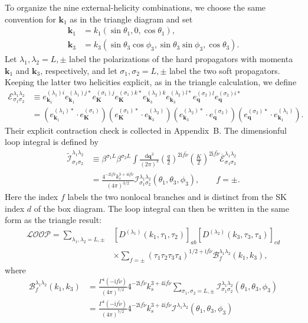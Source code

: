 \documentclass[a4paper,12pt]{article}
\def\di{{\mathrm{d}}}
\def\mb{\mathbf}
\def\ii{\mathrm{i}}
\def\be{\beta}
\def\si{\sigma}
\def\tn{\tilde\nu}
\begin{document}
To organize the nine external-helicity combinations, we choose the same convention for $\mb k_1$ as in
the triangle diagram and set
\begin{align}
    \mb k_1&=k_1(\sin\theta_1,0,\cos\theta_1), \\
    \mb k_3&=k_3(\sin\theta_3\cos\phi_3,\sin\theta_3\sin\phi_3,\cos\theta_3).
\end{align}
Let $\lambda_1,\lambda_2=L,\pm$ label the polarizations of the hard propagators with momenta
$\mb k_1$ and $\mb k_3$, respectively, and let $\sigma_1,\sigma_2=L,\pm$ label the two soft propagators.
Keeping the latter two helicities explicit, as in the triangle calculation, we define
\begin{align}
    \mathcal{E}^{\lambda_1\lambda_2}_{\sigma_1\sigma_2}
    &\equiv
    e_{\mb k_1}^{(\lambda_1)i}e_{\mb k_1}^{(\lambda_1)j*}
    e_{\mb K}^{(\sigma_1)j}e_{\mb K}^{(\sigma_1)k*}
    e_{\mb k_3}^{(\lambda_2)k}e_{\mb k_3}^{(\lambda_2)l*}
    e_{\mb q}^{(\sigma_2)l}e_{\mb q}^{(\sigma_2)i*} \nonumber \\
    &=(e_{\mb k_1}^{(\lambda_1)*}\cdot e_{\mb K}^{(\sigma_1)})
    (e_{\mb K}^{(\sigma_1)*}\cdot e_{\mb k_3}^{(\lambda_2)})
    (e_{\mb k_3}^{(\lambda_2)*}\cdot e_{\mb q}^{(\sigma_2)})
    (e_{\mb q}^{(\sigma_2)*}\cdot e_{\mb k_1}^{(\lambda_1)}).
\end{align}
Their explicit contraction check is collected in Appendix~B. The dimensionful loop integral is defined by
\begin{align}
    \widetilde{\mathcal{I}}^{\lambda_1\lambda_2}_{\sigma_1\sigma_2}
    &\equiv \be^{\si_1L} \be^{\si_2L} \int\frac{\di\mb q^3}{(2\pi)^3}
    \left(\frac{q}{2}\right)^{2\ii f\tn}
    \left(\frac{K}{2}\right)^{2\ii f\tn}
    \overline{\mathcal{E}}^{\lambda_1\lambda_2}_{\sigma_1\sigma_2} \nonumber \\
    &=\frac{4^{-2\ii f\tn}k_s^{3+4\ii f\tn}}{(4\pi)^{3/2}}
    \mathcal{I}^{\lambda_1\lambda_2}_{\sigma_1\sigma_2}(\theta_1,\theta_3,\phi_3),
    \qquad f=\pm.
\end{align}
Here the index $f$ labels the two nonlocal branches and is distinct from the SK index $d$ of the box
diagram. The loop integral can then be written in the same form as the triangle result:
\begin{align}
    \mathcal{LOOP}
    =\sum_{\lambda_1,\lambda_2=L,\pm}
    &\left[D^{(\lambda_1)}(k_1,\tau_1,\tau_2)\right]_{ab}
    \left[D^{(\lambda_2)}(k_3,\tau_3,\tau_4)\right]_{cd} \nonumber \\
    &\times\sum_{f=\pm}(\tau_1\tau_2\tau_3\tau_4)^{1/2+\ii f\tn}
    \mathcal{B}^{\lambda_1\lambda_2}_f(k_1,k_3),
\end{align}
where
\begin{align}
    \mathcal{B}^{\lambda_1\lambda_2}_f(k_1,k_3)
    &= \frac{\Gamma^4(-\ii f\tn)}{(4\pi)^{7/2}}
    4^{-2\ii f\tn}k_s^{3+4\ii f\tn}
    \sum_{\sigma_1,\sigma_2=L,\pm}
    \mathcal{I}^{\lambda_1\lambda_2}_{\sigma_1\sigma_2}(\theta_1,\theta_3,\phi_3) \nonumber \\
    &= \frac{\Gamma^4(-\ii f\tn)}{(4\pi)^{7/2}}
    4^{-2\ii f\tn}k_s^{3+4\ii f\tn}
    \mathcal{I}^{\lambda_1\lambda_2}(\theta_1,\theta_3,\phi_3)
\end{align}
\end{document}
